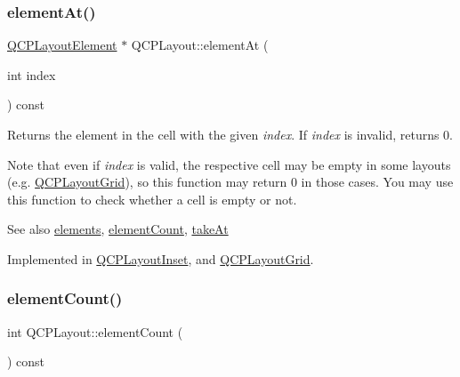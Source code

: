 \subsubsection{\texorpdfstring{element\+At()}{elementAt()}}
{\footnotesize\ttfamily \hyperlink{class_q_c_p_layout_element}{Q\+C\+P\+Layout\+Element} $\ast$ Q\+C\+P\+Layout\+::element\+At (\begin{DoxyParamCaption}\item[{int}]{index }\end{DoxyParamCaption}) const\hspace{0.3cm}{\ttfamily [pure virtual]}}

Returns the element in the cell with the given {\itshape index}. If {\itshape index} is invalid, returns 0.

Note that even if {\itshape index} is valid, the respective cell may be empty in some layouts (e.\+g. \hyperlink{class_q_c_p_layout_grid}{Q\+C\+P\+Layout\+Grid}), so this function may return 0 in those cases. You may use this function to check whether a cell is empty or not.

\begin{DoxySeeAlso}{See also}
\hyperlink{class_q_c_p_layout_adc9ebc73fc215f9cc22796712a251ff4}{elements}, \hyperlink{class_q_c_p_layout_a39d3e9ef5d9b82ab1885ba1cb9597e56}{element\+Count}, \hyperlink{class_q_c_p_layout_a5a79621fa0a6eabb8b520cfc04fb601a}{take\+At} 
\end{DoxySeeAlso}


Implemented in \hyperlink{class_q_c_p_layout_inset_a832e049f0bb32e7db0490a9c904098df}{Q\+C\+P\+Layout\+Inset}, and \hyperlink{class_q_c_p_layout_grid_a97672ecc379cb3a09639926ba9980297}{Q\+C\+P\+Layout\+Grid}.

\mbox{\label{class_q_c_p_layout_a39d3e9ef5d9b82ab1885ba1cb9597e56}} 
\subsubsection{\texorpdfstring{element\+Count()}{elementCount()}}
{\footnotesize\ttfamily int Q\+C\+P\+Layout\+::element\+Count (\begin{DoxyParamCaption}{ }\end{DoxyParamCaption}) const\hspace{0.3cm}{\ttfamily [pure virtual]}}

